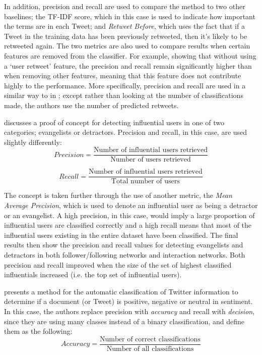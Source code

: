 In addition, precision and recall are used to compare the method to two other baselines; the TF-IDF score, which in this case is used to indicate how important the terms are in each Tweet; and \emph{Retweet Before}, which uses the fact that if a Tweet in the training data has been previously retweeted, then it's likely to be retweeted again. The two metrics are also used to compare results when certain features are removed from the classifier. For example, showing that without using a `user retweet' feature, the precision and recall remain significantly higher than when removing other features, meaning that this feature does not contribute highly to the performance. More specifically, precision and recall are used in a similar way to in \cite{castillo11}; except rather than looking at the number of classifications made, the authors use the number of predicted retweets.

\cite{bigonha10} discusses a proof of concept for detecting influential users in one of two categories; evangelists or detractors. Precision and recall, in this case, are used slightly differently:
\[	
	Precision = \frac{\text{Number of influential users retrieved}}{\text{Number of users retrieved}}
\]

\[
	Recall = \frac{\text{Number of influential users retrieved}}{\text{Total number of users}}
\]

The concept is taken further through the use of another metric, the \emph{Mean Average Precision}, which is used to denote an influential user as being a detractor or an evangelist. A high precision, in this case, would imply a large proportion of influential users are classified correctly and a high recall means that most of the influential users existing in the entire dataset have been classified. The final results then show the precision and recall values for detecting evangelists and detractors in both follower/following networks and interaction networks. Both precision and recall improved when the size of the set of highest classified influentials increased (i.e. the top set of influential users).

\cite{pak10} presents a method for the automatic classification of Twitter information to determine if a document (or Tweet) is positive, negative or neutral in sentiment. In this case, the authors replace precision with \emph{accuracy} and recall with \emph{decision}, since they are using many classes instead of a binary classification, and define them as the following:
\[	
	Accuracy = \frac{\text{Number of correct classifications}}{\text{Number of all classifications}}
\]

